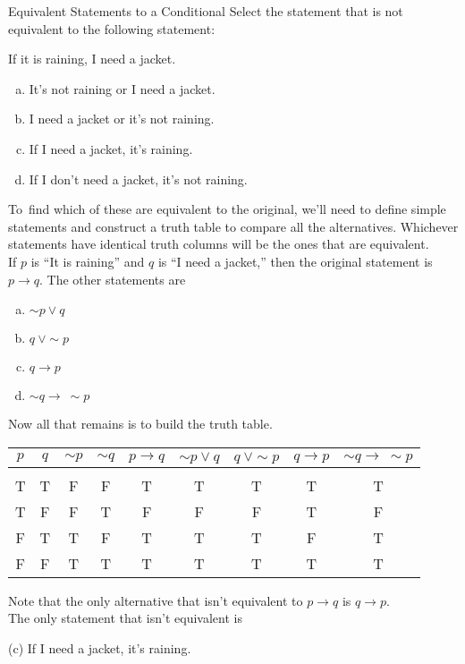 \begin{example}[https://www.youtube.com/watch?v=2pMpgmywnp8]{Equivalent Statements to a Conditional}
Select the statement that is not equivalent to the following statement:
\begin{center}
If it is raining, I need a jacket.
\end{center}
\begin{enumerate}[(a)]
\item It's not raining or I need a jacket.
\item I need a jacket or it's not raining.
\item If I need a jacket, it's raining.
\item If I don't need a jacket, it's not raining.
\end{enumerate}

To\sol\ find which of these are equivalent to the original, we'll need to define simple statements and construct a truth table to compare all the alternatives.  Whichever statements have identical truth columns will be the ones that are equivalent.\\

If $p$ is ``It is raining'' and $q$ is ``I need a jacket,'' then the original statement is $p \to q$.  The other statements are 
\begin{enumerate}[(a)]
\item $\sim p \vee q$
\item $q\ \vee \sim p$
\item $q \to p$
\item $\sim q \to\ \sim p$
\end{enumerate}

Now all that remains is to build the truth table.
\begin{center}
\begin{tabular}{|c c c c c c c c c|}
\hline
$p$ & $q$ & $\sim p$ & $\sim q$ & $p \to q$ & $\sim p \vee q$ & $q\ \vee \sim p$ & $q \to p$ & $\sim q \to\ \sim p$\\
\hline
& & & & & & & & \\
T & T & F & F & T & T & T & T & T\\
T & F & F & T & F & F & F & T & F\\
F & T & T & F & T & T & T & F & T\\
F & F & T & T & T & T & T & T & T\\
\hline
\end{tabular}
\end{center}

Note that the only alternative that isn't equivalent to $p \to q$ is $q \to p$.\\

The only statement that isn't equivalent is 
\begin{center}
(c) If I need a jacket, it's raining.
\end{center}
\end{example}

